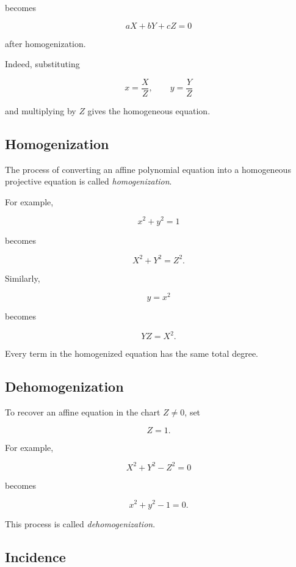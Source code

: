 becomes

\[
\boxed{
aX+bY+cZ=0
}
\]

after homogenization.

Indeed, substituting

\[
x=\frac{X}{Z},
\qquad
y=\frac{Y}{Z}
\]

and multiplying by \(Z\) gives the homogeneous equation.

\subsection{Homogenization}
\label{subsec:projective-homogenization}

The process of converting an affine polynomial equation into a homogeneous
projective equation is called \emph{homogenization}.

For example,

\[
x^2+y^2=1
\]

becomes

\[
\boxed{
X^2+Y^2=Z^2.
}
\]

Similarly,

\[
y=x^2
\]

becomes

\[
\boxed{
YZ=X^2.
}
\]

Every term in the homogenized equation has the same total degree.

\subsection{Dehomogenization}
\label{subsec:projective-dehomogenization}

To recover an affine equation in the chart \(Z\neq0\), set

\[
Z=1.
\]

For example,

\[
X^2+Y^2-Z^2=0
\]

becomes

\[
x^2+y^2-1=0.
\]

This process is called \emph{dehomogenization}.

\subsection{Incidence}
\label{subsec:projective-incidence}

